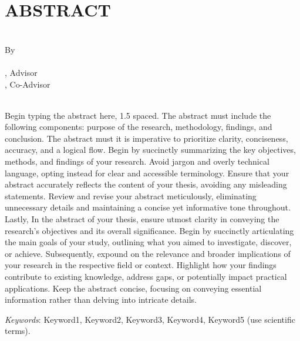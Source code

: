\chapter*{ABSTRACT}
\thispagestyle{fancy}

\begin{center}
  \TITLE \\[36pt]
  By \\ [12pt] \AUTHOR \\
  \ADVISOR, Advisor \\ \COADVISOR, Co-Advisor \\[0.3in]
   \\[36pt]
  
\end{center}
Begin typing the abstract here, 1.5 spaced. The abstract must include the following components: purpose of the research, methodology, findings, and conclusion. The abstract must it is imperative to prioritize clarity, conciseness, accuracy, and a logical flow. Begin by succinctly summarizing the key objectives, methods, and findings of your research. Avoid jargon and overly technical language, opting instead for clear and accessible terminology. Ensure that your abstract accurately reflects the content of your thesis, avoiding any misleading statements. Review and revise your abstract meticulously, eliminating unnecessary details and maintaining a concise yet informative tone throughout. Lastly, In the abstract of your thesis, ensure utmost clarity in conveying the research's objectives and its overall significance. Begin by succinctly articulating the main goals of your study, outlining what you aimed to investigate, discover, or achieve. Subsequently, expound on the relevance and broader implications of your research in the respective field or context. Highlight how your findings contribute to existing knowledge, address gaps, or potentially impact practical applications. Keep the abstract concise, focusing on conveying essential information rather than delving into intricate details. 

\vfill

\noindent \emph{Keywords}: Keyword1, Keyword2, Keyword3, Keyword4, Keyword5 (use scientific terms).
